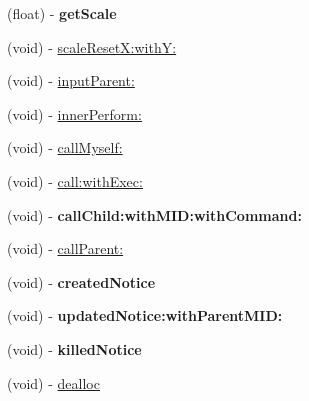 \begin{DoxyCompactItemize}
\item 
\hypertarget{interface_messenger_view_controller_a97b35c6553c0ec2e6aae62ec4f4e8db4}{
(float) -\/ {\bfseries getScale}}
\label{d7/d34/interface_messenger_view_controller_a97b35c6553c0ec2e6aae62ec4f4e8db4}

\item 
(void) -\/ \hyperlink{interface_messenger_view_controller_a9a0f05d1d3a3685a3d3ce7632c2bc7ee}{scaleResetX:withY:}
\item 
(void) -\/ \hyperlink{interface_messenger_view_controller_a33bb3cca76fba84a3e5b480131e5faf1}{inputParent:}
\item 
(void) -\/ \hyperlink{interface_messenger_view_controller_a2c415df83e46605177105d75c714e463}{innerPerform:}
\item 
(void) -\/ \hyperlink{interface_messenger_view_controller_a416d9acd2e8346b9ab8870b64571f322}{callMyself:}
\item 
(void) -\/ \hyperlink{interface_messenger_view_controller_a7a416a5ec2bcd17f259e1b2fc017d6a6}{call:withExec:}
\item 
\hypertarget{interface_messenger_view_controller_a95e335be7444d6a9fd4631fa8a5f9f3e}{
(void) -\/ {\bfseries callChild:withMID:withCommand:}}
\label{d7/d34/interface_messenger_view_controller_a95e335be7444d6a9fd4631fa8a5f9f3e}

\item 
(void) -\/ \hyperlink{interface_messenger_view_controller_afa8cf33ccddb2f83e214b192707bdbd6}{callParent:}
\item 
\hypertarget{interface_messenger_view_controller_ae8415c3e0079cb51a8374a47efa0bbd2}{
(void) -\/ {\bfseries createdNotice}}
\label{d7/d34/interface_messenger_view_controller_ae8415c3e0079cb51a8374a47efa0bbd2}

\item 
\hypertarget{interface_messenger_view_controller_a975afc92bea2290fcae8b57ab85985d3}{
(void) -\/ {\bfseries updatedNotice:withParentMID:}}
\label{d7/d34/interface_messenger_view_controller_a975afc92bea2290fcae8b57ab85985d3}

\item 
\hypertarget{interface_messenger_view_controller_abf4d1e2b5e6cd851f60601482ec500ef}{
(void) -\/ {\bfseries killedNotice}}
\label{d7/d34/interface_messenger_view_controller_abf4d1e2b5e6cd851f60601482ec500ef}

\item 
(void) -\/ \hyperlink{interface_messenger_view_controller_a764894e696ddb4254c216dbb8d58b279}{dealloc}
\end{DoxyCompactItemize}
